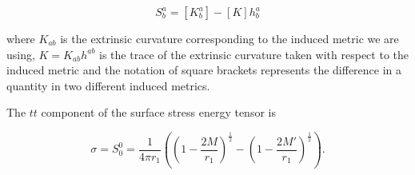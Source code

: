\documentclass[aps,showpacs,twocolumn,floats,prd,superscriptaddress,nofootinbib]{revtex4-1}
\begin{document}
\begin{equation}
	S^a_b =  [K^a_b] - [K]h^a_b
\end{equation}

where $K_{ab}$ is the extrinsic curvature corresponding to the induced metric we are using, $K = K_{ab} h^{ab}$ is the trace of the extrinsic curvature taken with respect to the induced metric and the notation of square brackets represents the difference in a quantity in two different induced metrics. 
%
%
%
%
%
%
%
%
%

The $tt$ component of the surface stress energy tensor is

\begin{equation}
	\sigma = S^0_0 =  \frac{1}{4 \pi r_1} \left( \left( 1 - \frac{2M}{r_1} \right)^\frac{1}{2} - \left( 1 - \frac{2M'}{r_1} \right)^\frac{1}{2} \right).	\label{sig}
\end{equation}
\end{document}
